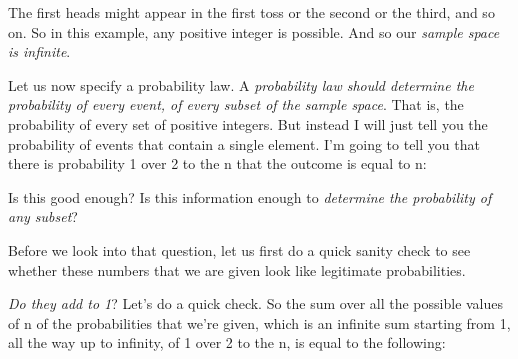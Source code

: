 \documentclass[pdftex, brazil, 12pt, twoside]{article}
\begin{document}
The first heads might appear in the first toss or the
second or the third, and so on.
So in this example, any positive integer is possible.
And so our \emph{sample space is infinite}.

Let us now specify a probability law.
A \emph{probability law should determine the probability of
every event, of every subset of the sample space}.
That is, the probability of every
set of positive integers.
But instead I will just tell you the probability of events
that contain a single element.
I'm going to tell you that there is probability 1 over 2
to the n that the outcome is equal to n:

\begin{figure}[H]
  \begin{center}
  \end{center}
\end{figure}

Is this good enough?
Is this information enough to \emph{determine the probability of
any subset}?

Before we look into that question, let us first do a
quick sanity check to see whether these numbers that we
are given look like legitimate probabilities.

\emph{Do they add to 1}?
Let's do a quick check.
So the sum over all the possible values of n of the
probabilities that we're given, which is an infinite
sum starting from 1, all the way up to infinity, of 1 over
2 to the n, is equal to the following:

\begin{figure}[H]
  \begin{center}
  \end{center}
\end{figure}
\end{document}
